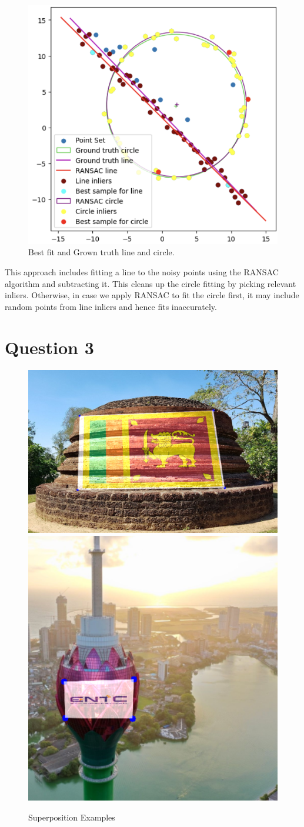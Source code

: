 \documentclass[12pt,a4paper]{article}
\begin{document}

    \begin{figure}[H]
        \centering
        \includegraphics[width=0.5\linewidth]{images/Screenshots/2.png}
        \caption{Best fit and Grown truth line and circle.}
        \label{fig:enter-label}
    \end{figure}

This approach includes fitting a line to the noisy points using the RANSAC algorithm and subtracting it. This cleans up the circle fitting by picking relevant inliers. Otherwise, in case we apply RANSAC to fit the circle first, it may include random points from line inliers and hence fits inaccurately.



\section{Question 3}
    
    
    
    \begin{figure}[H]
        \centering
        \includegraphics[width=0.5\linewidth]{images/Screenshots/3_1.png}
        \includegraphics[width=0.4\linewidth]{images/Screenshots/3_2.png}
        \caption{Superposition Examples}
        \label{fig:enter-label}
    \end{figure}
\end{document}
